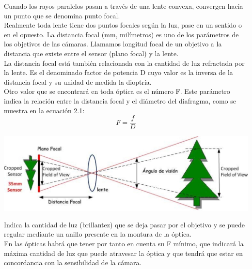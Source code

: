 Cuando los rayos paralelos pasan a través de una lente convexa, convergen
hacia un punto que se denomina punto focal.\\
Realmente toda lente tiene dos puntos focales según la luz, pase en un sentido o
en el opuesto. La distancia focal (mm, milímetros) es uno de los parámetros de los
objetivos de las cámaras. Llamamos longitud focal de un objetivo a la distancia que
existe entre el sensor (plano focal) y la lente.\\
La distancia focal está también relacionada con la cantidad de luz
refractada por la lente. Es el denominado factor de potencia D cuyo valor es la inversa
de la distancia focal y su unidad de medida la dioptría.\\
Otro valor que se encontrará en toda óptica es el número F. Este parámetro
indica la relación entre la distancia focal y el diámetro del diafragma, como se muestra en la ecuación 2.1:
\begin{equation}
	F = \frac{f}{D}
\end{equation}
\begin{center}
	\includegraphics[width=1.0 \textwidth]{Contenido/Cuerpo/Capitulo2/Fig1_4.eps}
	\label{fig:MarcoTeorico:Fig6}
\end{center}
Indica la cantidad de luz (brillantez) que se deja pasar por el objetivo y se puede regular
mediante un anillo presente en la montura de la óptica.\\
En las ópticas habrá que tener por
tanto en cuenta su F mínimo, que indicará la máxima cantidad de luz que puede
atravesar la óptica y que tendrá que estar en concordancia con la sensibilidad de la
cámara.

